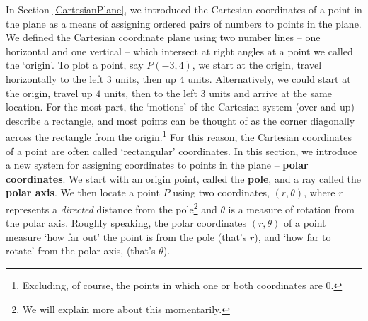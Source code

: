

\setcounter{footnote}{0}

\label{IntroPolar}

In Section \ref{CartesianPlane}, we introduced the Cartesian coordinates of a point in the plane as a means of assigning ordered pairs of numbers to points in the plane.  We defined the Cartesian coordinate plane using two number lines -- one horizontal and one vertical -- which intersect at right angles at a point we called the `origin'. To plot a point, say $P(-3,4)$, we start at the origin, travel horizontally to the left $3$ units, then up $4$ units. Alternatively, we could start at the origin, travel up $4$ units, then to the left $3$ units and arrive at the same location. For the most part, the `motions' of the Cartesian system (over and up) describe a rectangle, and most points can be thought of as the corner diagonally across the rectangle from the origin.\footnote{Excluding, of course, the points in which one or both coordinates are $0$.}  For this reason, the Cartesian coordinates of a point are often called    `rectangular' coordinates. In this section, we introduce a new system for assigning coordinates to points in the plane --   \textbf{polar coordinates}.  We start with an origin point, called the  \textbf{pole}, and a ray called the  \textbf{polar axis}. We then locate a point $P$ using two coordinates, $(r,\theta)$, where $r$ represents a \textit{directed} distance from the pole\footnote{We will explain more about this momentarily.} and $\theta$ is a measure of rotation from the polar axis.  Roughly speaking,  the polar coordinates $(r,\theta)$ of a point measure `how far out' the point is from the pole (that's $r$), and `how far to rotate' from the polar axis, (that's $\theta$).



